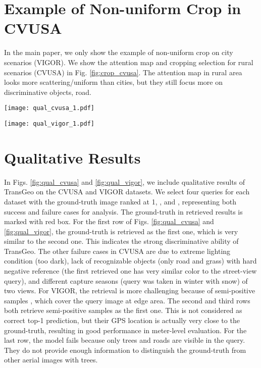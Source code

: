 \documentclass[10pt,twocolumn,letterpaper]{article}
\begin{document}
\section{Example of Non-uniform Crop in CVUSA}
In the main paper, we only show the example of non-uniform crop on city scenarios (VIGOR). We show the attention map and cropping selection for rural scenarios (CVUSA) in Fig. \ref{fig:crop_cvusa}. The attention map in rural area looks more scattering/uniform than cities, but they still focus more on discriminative objects, \eg road.

\begin{figure*}[!htbp]
    \centering
    \texttt{[image: qual\_cvusa\_1.pdf]}
    \caption{Qualitative results on CVUSA. Red box indicates ground-truth in retrieved results. The ground-truth is ranked at  for four queries respectively.}
    \label{fig:qual_cvusa}
\end{figure*}

\begin{figure*}[!htbp]
    \centering
    \texttt{[image: qual\_vigor\_1.pdf]}
    \caption{Qualitative results on VIGOR. Red box indicates ground-truth in retrieved results. The ground-truth is ranked at  for four queries respectively.}
    \label{fig:qual_vigor}
\end{figure*}
\section{Qualitative Results}
\label{sec:qualitative}


In Figs. \ref{fig:qual_cvusa} and \ref{fig:qual_vigor}, we include qualitative results of TransGeo on the CVUSA and VIGOR datasets. We select four queries for each dataset with the ground-truth image ranked at 1, ,  and , representing both success and failure cases for analysis. The ground-truth in retrieved results is marked with red box. For the first row of Figs. \ref{fig:qual_cvusa} and \ref{fig:qual_vigor}, the ground-truth is retrieved as the first one, which is very similar to the second one. This indicates the strong discriminative ability of TransGeo. The other failure cases in CVUSA are due to extreme lighting condition (too dark), lack of recognizable objects (only road and grass) with hard negative reference (the first retrieved one has very similar color to the street-view query), and different capture seasons (query was taken in winter with snow) of two views. For VIGOR, the retrieval is more challenging because of semi-positive samples \cite{zhu2021vigor}, which cover the query image at edge area. The second and third rows both retrieve semi-positive samples as the first one. This is not considered as correct top-1 prediction, but their GPS location is actually very close to the ground-truth, resulting in good performance in meter-level evaluation. For the last row, the model fails because only trees and roads are visible in the query. They do not provide enough information to distinguish the ground-truth from other aerial images with trees.
\end{document}
